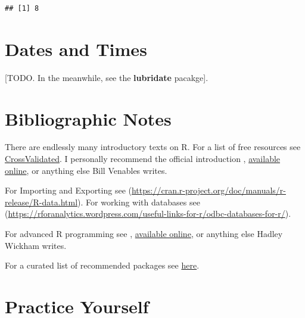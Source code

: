\documentclass[]{book}
\theoremstyle{definition}
\theoremstyle{definition}
\theoremstyle{definition}
\theoremstyle{remark}
\begin{document}
\begin{verbatim}
## [1] 8
\end{verbatim}

\section{Dates and Times}\label{dates-and-times}

{[}TODO. In the meanwhile, see the \textbf{lubridate} pacakge{]}.

\section{Bibliographic Notes}\label{bibliographic-notes-1}

There are endlessly many introductory texts on R. For a list of free
resources see
\href{http://stats.stackexchange.com/questions/138/free-resources-for-learning-r}{CrossValidated}.
I personally recommend the official introduction
\citet{venables2004introduction},
\href{https://cran.r-project.org/doc/manuals/r-release/R-intro.pdf}{available
online}, or anything else Bill Venables writes.

For Importing and Exporting see
(\url{https://cran.r-project.org/doc/manuals/r-release/R-data.html}).
For working with databases see
(\url{https://rforanalytics.wordpress.com/useful-links-for-r/odbc-databases-for-r/}).

For advanced R programming see \citet{wickham2014advanced},
\href{http://adv-r.had.co.nz/}{available online}, or anything else
Hadley Wickham writes.

For a curated list of recommended packages see
\href{https://github.com/rstudio/RStartHere/blob/master/README.md}{here}.

\section{Practice Yourself}\label{practice-yourself-1}
\end{document}
